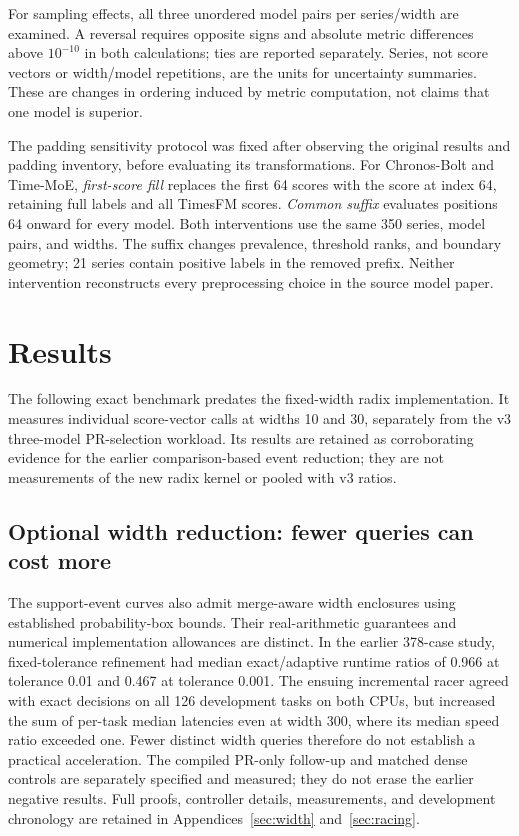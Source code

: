 \documentclass[10pt]{article}
\begin{document}
For sampling effects, all three unordered model pairs per series/width are
examined. A reversal requires opposite signs and absolute metric differences
above $10^{-10}$ in both calculations; ties are reported separately. Series,
not score vectors or width/model repetitions, are the units for uncertainty
summaries. These are changes in ordering induced by metric computation, not
claims that one model is superior.

The padding sensitivity protocol was fixed after observing the original
results and padding inventory, before evaluating its transformations.
For Chronos-Bolt and Time-MoE, \emph{first-score fill} replaces the first
64 scores with the score at index 64, retaining full labels and all TimesFM
scores. \emph{Common suffix} evaluates positions 64 onward for every model.
Both interventions use the same 350 series, model pairs, and widths.
The suffix changes prevalence, threshold ranks, and boundary geometry;
21 series contain positive labels in the removed prefix. Neither intervention
reconstructs every preprocessing choice in the source model paper.

\section{Results}

The following exact benchmark predates the fixed-width radix implementation.
It measures individual score-vector calls at widths 10 and 30, separately
from the v3 three-model PR-selection workload. Its results are retained as
corroborating evidence for the earlier comparison-based event reduction;
they are not measurements of the new radix kernel or pooled with v3 ratios.


\subsection{Optional width reduction: fewer queries can cost more}
The support-event curves also admit merge-aware width enclosures using
established probability-box bounds. Their real-arithmetic guarantees and
numerical implementation allowances are distinct. In the earlier 378-case
study, fixed-tolerance refinement had median exact/adaptive runtime ratios
of 0.966 at tolerance 0.01 and 0.467 at tolerance 0.001. The ensuing
incremental racer agreed with exact decisions on all 126 development tasks
on both CPUs, but increased the sum of per-task median latencies even at
width 300, where its median speed ratio exceeded one. Fewer distinct width
queries therefore do not establish a practical acceleration. The compiled
PR-only follow-up and matched dense controls are separately specified and
measured; they do not erase the earlier negative results. Full proofs,
controller details, measurements, and development chronology are retained
in Appendices~\ref{sec:width} and~\ref{sec:racing}.
\end{document}
